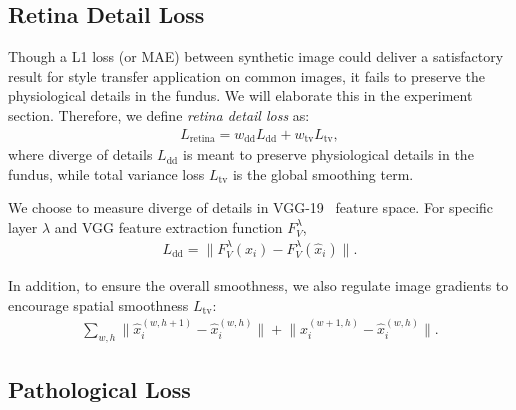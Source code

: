 \documentclass[letterpaper]{article} %
\begin{document}






	\subsection{Retina Detail Loss}
    \label{sec:retina_detail}

    Though a  L1 loss (or MAE) between synthetic image could deliver a satisfactory result for style transfer application on common images, it fails to preserve the physiological details in the fundus. We will elaborate this in the experiment section. Therefore, we define \emph{retina detail loss} as:
	\begin{align}
	\label{align_retina_loss}
	L_\mathrm{retina} = w_\mathrm{dd} L_\mathrm{dd} + w_\mathrm{tv} L_\mathrm{tv},
	\end{align}
	where diverge of details $L_\mathrm{dd}$ is meant to preserve physiological details in the fundus, while total variance loss $L_\mathrm{tv}$ is the global smoothing term.

		We choose to measure diverge of details in VGG-19~\cite{DBLP:journals/corr/SimonyanZ14a} feature space. For specific layer $ \lambda $ and VGG feature extraction function $ F_V^\lambda $,
	\begin{align}
	\label{align_dd_loss}
	L_\mathrm{dd} =  {\lVert F_V^\lambda(x_i) - F_V^\lambda(\hat x_i) \lVert}.
	\end{align}

	In addition, to ensure the overall smoothness, we also regulate image gradients to encourage spatial smoothness $L_\mathrm{tv}$:
	\begin{align}
	\label{align_tv_loss} \textstyle
	\sum_{w,h}{\lVert \hat{x}_i^{(w,h+1)} - \hat{x}_i^{(w,h)} \lVert}
	+ {\lVert \hat{x}_i^{(w+1,h)} - \hat{x}_i^{(w,h)} \lVert}.
	\end{align}

	\subsection{Pathological Loss}
\end{document}
